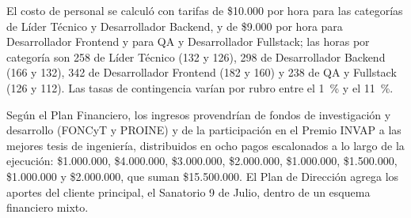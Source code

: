 El costo de personal se calculó con tarifas de \$10.000 por hora para las categorías de Líder Técnico y Desarrollador Backend, y de \$9.000 por hora para Desarrollador Frontend y para QA y Desarrollador Fullstack; las horas por categoría son 258 de Líder Técnico (132 y 126), 298 de Desarrollador Backend (166 y 132), 342 de Desarrollador Frontend (182 y 160) y 238 de QA y Fullstack (126 y 112). Las tasas de contingencia varían por rubro entre el 1~\% y el 11~\%.

Según el Plan Financiero, los ingresos provendrían de fondos de investigación y desarrollo (FONCyT y PROINE) y de la participación en el Premio INVAP a las mejores tesis de ingeniería, distribuidos en ocho pagos escalonados a lo largo de la ejecución: \$1.000.000, \$4.000.000, \$3.000.000, \$2.000.000, \$1.000.000, \$1.500.000, \$1.000.000 y \$2.000.000, que suman \$15.500.000. El Plan de Dirección agrega los aportes del cliente principal, el Sanatorio 9 de Julio, dentro de un esquema financiero mixto.

